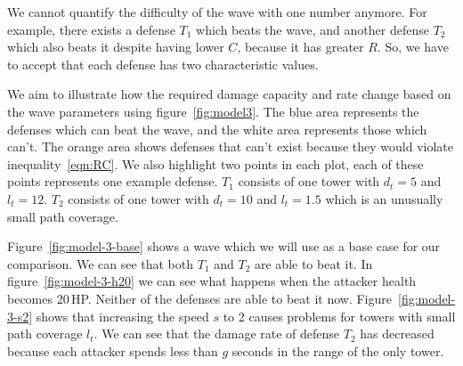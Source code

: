 We cannot quantify the difficulty of the wave with one number anymore.
For example, there exists a defense $T_1$ which beats the wave, and another defense $T_2$ which also beats it despite having lower $C$, because it has greater $R$.
So, we have to accept that each defense has two characteristic values.

We aim to illustrate how the required damage capacity and rate change based on the wave parameters using figure~\ref{fig:model3}.
The blue area represents the defenses which can beat the wave, and the white area represents those which can't.
The orange area shows defenses that can't exist because they would violate inequality~\ref{eqn:RC}.
We also highlight two points in each plot, each of these points represents one example defense.
$T_1$ consists of one tower with $d_t=5$ and $l_t=12$.
$T_2$ consists of one tower with $d_t=10$ and $l_t=1.5$ which is an unusually small path coverage.

Figure~\ref{fig:model-3-base} shows a wave which we will use as a base case for our comparison.
We can see that both $T_1$ and $T_2$ are able to beat it.
In figure~\ref{fig:model-3-h20} we can see what happens when the attacker health becomes 20\,HP.
Neither of the defenses are able to beat it now.
Figure~\ref{fig:model-3-s2} shows that increasing the speed $s$ to 2 causes problems for towers with small path coverage $l_t$.
We can see that the damage rate of defense $T_2$ has decreased because each attacker spends less than $g$ seconds in the range of the only tower.


